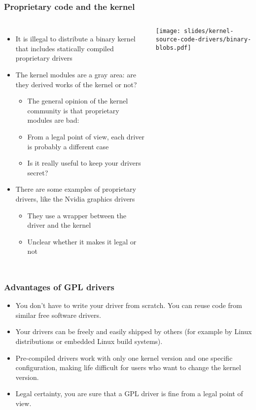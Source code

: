 \begin{frame}
  \frametitle{Proprietary code and the kernel}
  \begin{columns}
  \begin{itemize}
  \item It is illegal to distribute a binary kernel that includes
    statically compiled proprietary drivers
  \item The kernel modules are a gray area: are they derived works of
    the kernel or not?
    \begin{itemize}
    \item The general opinion of the kernel community is that
      proprietary modules are bad: 
    \item From a legal point of view, each driver is probably a
      different case
    \item Is it really useful to keep your drivers secret?
    \end{itemize}
  \item There are some examples of proprietary drivers, like the
    Nvidia graphics drivers
    \begin{itemize}
    \item They use a wrapper between the driver and the kernel
    \item Unclear whether it makes it legal or not
    \end{itemize}
  \end{itemize}
    \texttt{[image: slides/kernel-source-code-drivers/binary-blobs.pdf]}
  \end{columns}
\end{frame}

\begin{frame}
  \frametitle{Advantages of GPL drivers}
  \begin{itemize}
  \item You don't have to write your driver from scratch. You can
    reuse code from similar free software drivers.
  \item Your drivers can be freely and easily shipped by others (for
    example by Linux distributions or embedded Linux build systems).
  \item Pre-compiled drivers work with only one kernel version and one
    specific configuration, making life difficult for users who want
    to change the kernel version.
  \item Legal certainty, you are sure that a GPL driver is fine from a
    legal point of view.
  \end{itemize}
\end{frame}

